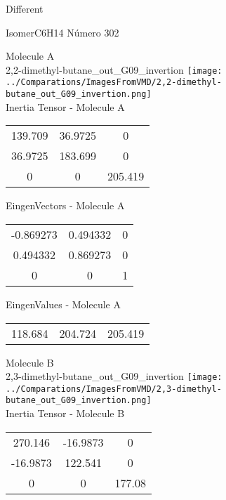 \begin{center}
\vtab
\vtab
\textcolor{NavyBlue}{\Large Different}
\end{center}

 \newpage

\vtab[-2cm]
\begin{center}
{\large IsomerC6H14 \tab Número 302}
\end{center}
\begin{multicols}{2}
\begin{center}

Molecule A \\ 
2,2-dimethyl-butane\_out\_G09\_invertion
\texttt{[image: ../Comparations/ImagesFromVMD/2,2-dimethyl-butane\_out\_G09\_invertion.png]}
\\
Inertia Tensor - Molecule A \\
\vtab

\begin{tabular}{|c c c|}
139.709	 & 	36.9725	 & 	0	 \\
36.9725	 & 	183.699	 & 	0	 \\
0	 & 	0	 & 	205.419
\end{tabular}

\vtab
 EingenVectors - Molecule A     \\
\vtab
\begin{tabular}{|c c c|}
-0.869273	 & 	0.494332	 & 	0	 \\
0.494332	 & 	0.869273	 & 	0	 \\
0	 & 	0	 & 	1
\end{tabular}

\vtab
 EingenValues - Molecule A     \\
\vtab
\begin{tabular}{|c c c|}
118.684	 & 	204.724	 & 	205.419	 \\
\end{tabular}
\columnbreak

Molecule B \\ 
2,3-dimethyl-butane\_out\_G09\_invertion
\texttt{[image: ../Comparations/ImagesFromVMD/2,3-dimethyl-butane\_out\_G09\_invertion.png]}
\\
Inertia Tensor - Molecule B \\
\vtab

\begin{tabular}{|c c c|}
270.146	 & 	-16.9873	 & 	0	 \\
-16.9873	 & 	122.541	 & 	0	 \\
0	 & 	0	 & 	177.08
\end{tabular}


\end{center}
\end{multicols}
